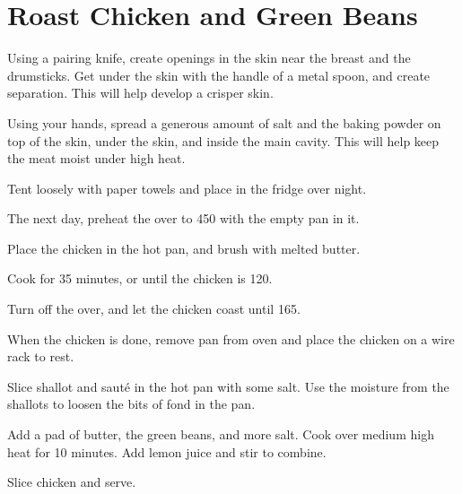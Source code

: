 \section{Roast Chicken and Green Beans}
\begin{recipe}



Using a pairing knife, create openings in the skin near the breast and the drumsticks. Get under the skin with the handle of a metal spoon, and create separation. This will help develop a crisper skin.

Using your hands, spread a generous amount of salt and the baking powder on top of the skin, under the skin, and inside the main cavity. This will help keep the meat moist under high heat.

Tent loosely with paper towels and place in the fridge over night.

The next day, preheat the over to 450 with the empty pan in it. 


Place the chicken in the hot pan, and brush with melted butter. 

Cook for 35 minutes, or until the chicken is 120. 

Turn off the over, and let the chicken coast until 165. 


When the chicken is done, remove pan from oven and place the chicken on a wire rack to rest.

Slice shallot and sauté in the hot pan with some salt. Use the moisture from the shallots to loosen the bits of fond in the pan.

Add a pad of butter, the green beans, and more salt. Cook over medium high heat for 10 minutes. Add lemon juice and stir to combine.

Slice chicken and serve.

\end{recipe}
